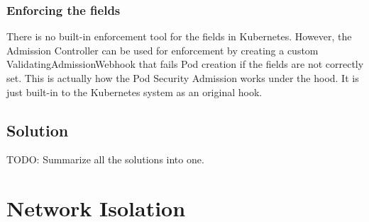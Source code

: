 \documentclass[english, 12pt, a4paper, sci, utf8, a-2b, online]{aaltothesis}
\begin{document}


\subsubsection{Enforcing the fields}

There is no built-in enforcement tool for the fields in Kubernetes.
However, the Admission Controller can be used for enforcement by creating a custom ValidatingAdmissionWebhook that fails Pod creation if the fields are not correctly set.
This is actually how the Pod Security Admission works under the hood.
It is just built-in to the Kubernetes system as an original hook.


\subsection{Solution}

TODO: Summarize all the solutions into one.

\clearpage

\section{Network Isolation} \label{sec:network-solution}
\end{document}
